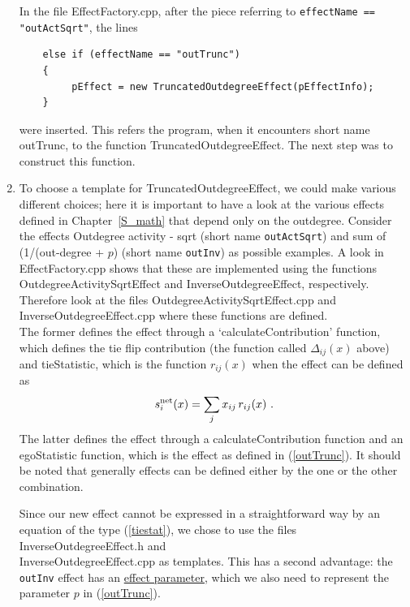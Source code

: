 \documentclass[a4paper,fleqn,11pt]{article}
\newcommand{\+}{\, + \,}
\newcommand{\sfn}[1]{\textsf{#1}}
\begin{document}
\begin{enumerate}
      In the file \textsf{EffectFactory.cpp}, after the piece referring
      to \texttt{effectName == "outActSqrt"}, the lines
\begin{verbatim}
    else if (effectName == "outTrunc")
    {
         pEffect = new TruncatedOutdegreeEffect(pEffectInfo);
    }
\end{verbatim}
      were inserted.  This refers the program, when it encounters short name
      \sfn{outTrunc}, to the function \sfn{TruncatedOutdegreeEffect}.  The next
      step was to construct this function.
\item To choose a template for \sfn{TruncatedOutdegreeEffect},
      we could make various
      different choices; here it is important to have a look at the various
      effects defined in Chapter~\ref{S_math} that depend only on the
      outdegree. Consider the effects Outdegree activity - sqrt
      (short name \texttt{outActSqrt})
      and sum of (1/(out-degree + $p$) (short name \texttt{outInv})
      as possible examples.
      A look in  \textsf{EffectFactory.cpp} shows that these are implemented
      using the functions
      \textsf{OutdegreeActivitySqrtEffect}
      and \textsf{InverseOutdegreeEffect}, respectively.
      Therefore look at the files \textsf{OutdegreeActivitySqrtEffect.cpp}
      and \textsf{InverseOutdegreeEffect.cpp} where these functions
      are defined.\\
      The former defines the effect through a
      `\sfn{calculateContribution}' function, which defines the
      tie flip contribution
      (the function called $\Delta_{ij}(x)$ above)
      and \sfn{tieStatistic}, which is the function $r_{ij}(x)$
      when the effect can be defined as
      \begin{equation}
       s^{\rm net}_{i}(x) = \sum_j x_{ij}\,r_{ij}(x) \ .  \label{tiestat}
      \end{equation}
      The latter defines the effect through  a
      \sfn{calculateContribution} function and an\\
      \sfn{egoStatistic} function, which is the effect
      as defined in (\ref{outTrunc}). It should be noted that
      generally effects can be defined either by the one or the other
      combination.


      Since our new effect cannot be expressed in a straightforward way
      by an equation of the type (\ref{tiestat}), we chose to use
      the files \textsf{InverseOutdegreeEffect.h} and\\
      \textsf{InverseOutdegreeEffect.cpp} as templates.
      This has a second advantage: the  \texttt{outInv} effect has an
      \hyperlink{T_effpar}{effect parameter}, which we also need
      to represent the parameter $p$ in  (\ref{outTrunc}).


\end{enumerate}
\end{document}
